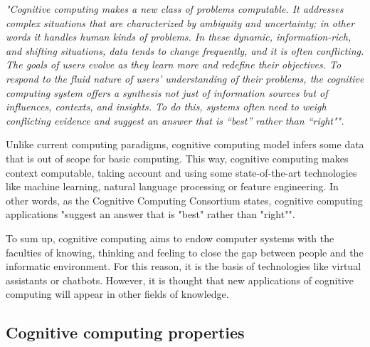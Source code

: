\textsl{"Cognitive computing makes a new class of problems computable. It addresses complex situations that are characterized by ambiguity and uncertainty; in other words it handles human kinds of problems. In these dynamic, information-rich, and shifting situations, data tends to change frequently, and it is often conflicting. The goals of users evolve as they learn more and redefine their objectives. To respond to the fluid nature of users’ understanding of their problems, the cognitive computing system offers a synthesis not just of information sources but of influences, contexts, and insights. To do this, systems often need to weigh conflicting evidence and suggest an answer that is “best” rather than “right"".}

Unlike current computing paradigms, cognitive computing model infers some data that is out of scope for basic computing. This way, cognitive computing makes context computable, taking account and using some state-of-the-art technologies like machine learning, natural language processing or feature engineering. In other words, as the Cognitive Computing Consortium states, cognitive computing applications "suggest an answer that is "best" rather than "right"".

To sum up, cognitive computing aims to endow computer systems with the faculties of knowing, thinking and feeling\cite{cognitive_gutierrez_garcia} to close the gap between people and the informatic environment. For this reason, it is the basis of technologies like virtual assistants or chatbots. However, it is thought that new applications of cognitive computing will appear in other fields of knowledge.

\subsection{Cognitive computing properties}


